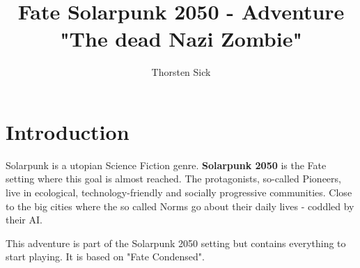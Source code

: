 \documentclass{book}
\title{Fate Solarpunk 2050 - Adventure "The dead Nazi Zombie"}
\author{Thorsten Sick}
\begin{document}
\tableofcontents

\chapter{Introduction}


Solarpunk is a utopian Science Fiction genre. \textbf{Solarpunk 2050} is the Fate setting where this goal is almost reached. The protagonists, so-called Pioneers, live in ecological, technology-friendly and socially progressive communities. Close to the big cities where the so called Norms go about their daily lives - coddled by their AI.

This adventure is part of the Solarpunk 2050 setting but contains everything to start playing. It is based on "Fate Condensed".


\end{document}
